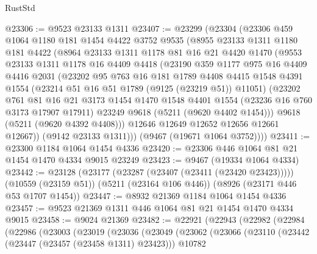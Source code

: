\begin{lexlean}{RustStd}
\begin{coremodule}
@23306 := @9523 @23133 @1311
@23407 := @23299
    (@23304
      (@23306
        @459
        @1064
        @1180
        @181
        @1454
        @4422
        @3752
        @9535
        (@8955
          @23133
          @1311
          @1180
          @181
          @4422
          (@8964
            @23133
            @1311
            @1178
            @81
            @16
            @21
            @4420
            @1470
            (@9553
              @23133
              @1311
              @1178
              @16
              @4409
              @4418
              (@23190
                @359
                @1177
                @975
                @16
                @4409
                @4416
                @2031
                (@23202
                  @95
                  @763
                  @16
                  @181
                  @1789
                  @4408
                  @4415
                  @1548
                  @4391
                  @1554
                  (@23214 @51 @16 @51 @1789 (@9125 (@23219 @51)) @11051)
                  (@23202
                    @761
                    @81
                    @16
                    @21
                    @3173
                    @1454
                    @1470
                    @1548
                    @4401
                    @1554
                    (@23236 @16 @760 @3173 @17907 @17911)
                    @23249
                    @9618
                    (@5211 (@9620 @4402 @1454)))
                  @9618
                  (@5211 (@9620 @4392 @4408)))
                @12646
                @12649
                @12652
                @12656
                @12661
                @12667))
            (@9142 @23133 @1311)))
        (@9467 (@19671 @1064 @3752))))
@23411 := @23300 @1184 @1064 @1454 @4336
@23420 := @23306 @446 @1064 @81 @21 @1454 @1470 @4334 @9015 @23249
@23423 := @9467 (@19334 @1064 @4334)
@23442 := @23128
    (@23177 (@23287 (@23407 (@23411 (@23420 @23423)))))
    (@10559 (@23159 @51))
    (@5211 (@23164 @106 @446))
    (@8926 (@23171 @446 @53 @1707 @1454))
@23447 := @8932 @21369 @1184 @1064 @1454 @4336
@23457 := @9523 @21369 @1311 @446 @1064 @81 @21 @1454 @1470 @4334 @9015
@23458 := @9024 @21369
@23482 := @22921
    (@22943
      (@22982
        (@22984
          (@22986
            (@23003
              (@23019
                (@23036
                  (@23049
                    (@23062
                      (@23066
                        (@23110
                          (@23442 (@23447 (@23457 (@23458 @1311) @23423)))
                          @10782

\end{coremodule}
\end{lexlean}
